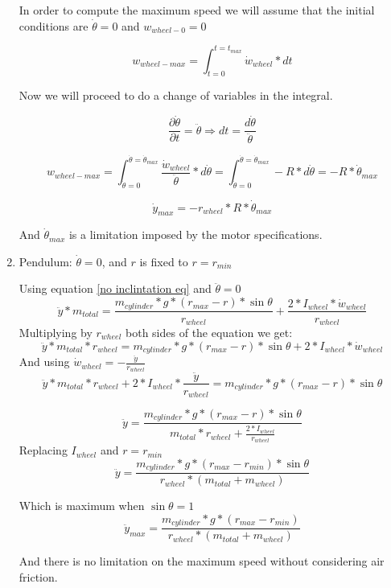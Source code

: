 \begin{enumerate}
    In order to compute the maximum speed we will assume that the initial conditions are $\dot{\theta} = 0$ and $w_{wheel-0}=0$

    \[w_{wheel-max} = \int_{t=0}^{t=t_{max}} \dot{w}_{wheel} * dt\]

    Now we will proceed to do a change of variables in the integral.

    \[
    \frac{\partial \dot{\theta}}{\partial t} = \ddot{\theta} \Rightarrow dt = \frac{d\dot{\theta}}{\ddot{\theta}}
    \]
    
    \[w_{wheel-max} = \int_{\dot{\theta}=0}^{\dot{\theta}=\dot{\theta}_{max}} \frac{\dot{w}_{wheel}}{\ddot{\theta}} * d\dot{\theta} = 
    \int_{\dot{\theta}=0}^{\dot{\theta}=\dot{\theta}_{max}} -R * d\dot{\theta} = - R * \dot{\theta}_{max}
    \]
    
    \[\boxed{\dot{y}_{max} = - r_{wheel} * R * \dot{\theta}_{max}}\]

    And $\dot{\theta}_{max}$ is a limitation imposed by the motor specifications.


    \item Pendulum: $\dot{\theta} = 0$, and $r$ is fixed to $r = r_{min}$
    
    Using equation \ref{no inclintation eq} and $\ddot{\theta} = 0$
    \[\ddot{y}*m_{total} = \frac{m_{cylinder} * g * (r_{max} - r) * \sin{\theta}}{r_{wheel}} +\frac{2*I_{wheel} * \dot{w}_{wheel}}{r_{wheel}}\]
    Multiplying by $r_{wheel}$ both sides of the equation we get:
    \[\ddot{y}*m_{total} * r_{wheel} = m_{cylinder} * g * (r_{max}-r) * \sin{\theta} + 2*I_{wheel} * \dot{w}_{wheel}\]
    And using $\dot{w}_{wheel} = -\frac{\ddot{y}}{r_{wheel}}$
    \[\ddot{y}*m_{total} * r_{wheel} + 2* I_{wheel} * \frac{\ddot{y}}{r_{wheel}} = m_{cylinder} * g * (r_{max}-r) * \sin{\theta} \]

    \[\ddot{y}  = \frac{m_{cylinder} * g * (r_{max}-r) * \sin{\theta}}{m_{total} * r_{wheel} + \frac{2*I_{wheel}}{r_{wheel}} }  \]
    Replacing $I_{wheel}$ and $r=r_{min}$
    \[\ddot{y}  = \frac{m_{cylinder} * g * (r_{max}- r_{min}) * \sin{\theta}}{ r_{wheel} * (m_{total} + m_{wheel}) }  \]

    Which is maximum when $\sin{\theta}=1$
    \[\boxed{\ddot{y}_{max}  = \frac{m_{cylinder} * g * (r_{max}- r_{min})}{ r_{wheel} * (m_{total} + m_{wheel}) } } \]
    
    And there is no limitation on the maximum speed without considering air friction.
\end{enumerate}


